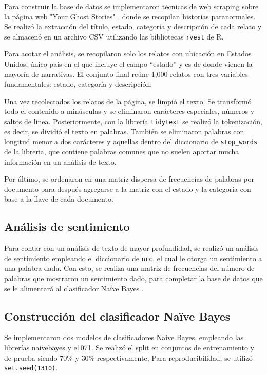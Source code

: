 \documentclass[eng]{ajceam-class}
\begin{document}
Para construir la base de datos se implementaron técnicas de web scraping sobre la página web "Your Ghost Stories" \cite{yourghoststories_2025}, donde se recopilan historias paranormales. Se realizó la extracción del título, estado, categoría y descripción de cada relato y se almacenó en un archivo CSV utilizando las bibliotecas \texttt{rvest} de R.

Para acotar el análisis, se recopilaron solo los relatos con ubicación en Estados Unidos, único país en el que incluye el campo “estado” y es de donde vienen la mayoría de narrativas. El conjunto final reúne 1,000 relatos con tres variables fundamentales: estado, categoría y descripción.

Una vez recolectados los relatos de la página, se limpió el texto. Se transformó todo el contenido a minúsculas y se eliminaron carácteres especiales, números y saltos de línea. Posteriormente, con la librería \texttt{tidytext} se realizó la tokenización, es decir, se dividió el texto en palabras. También se eliminaron palabras con longitud menor a dos carácteres y aquellas dentro del diccionario de \texttt{stop\_words} de la libreria, que contiene palabras comunes que no suelen aportar mucha información en un análisis de texto. 

Por último, se ordenaron en una matriz dispersa de frecuencias de palabras por documento para después agregarse a la matriz con el estado y la categoría con base a la llave de cada documento.

\subsection{Análisis de sentimiento}

Para contar con un análisis de texto de mayor profundidad, se realizó un análisis de sentimiento empleando el diccionario de \texttt{nrc}, el cual le otorga un sentimiento a una palabra dada. Con esto, se realiza una matriz de frecuencias del número de palabras que mostraron un sentimiento dado, para completar la base de datos que se le alimentará al clasificador Naïve Bayes \cite{silge2017}. 

\subsection{Construcción del clasificador Naïve Bayes}

Se implementaron dos modelos de clasificadores Naive Bayes, empleando las librerías naivebayes y e1071. Se realizó el split en conjuntos de entrenamiento y de prueba siendo $70\%$ y $30\%$ respectivamente, Para reproducibilidad, se utilizó \texttt{set.seed(1310)}. 
\end{document}
